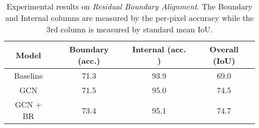 \documentclass[10pt,twocolumn,letterpaper]{article}
\begin{document}
   \begin{table}[h]
   \small
      \begin{center}
         \begin{tabular}{|c|c|c|c|}
            \hline
             Model & Boundary (acc.) & Internal (acc. ) & Overall (IoU) \\
            \hline
            Baseline & 71.3 & 93.9 & 69.0\\
            \hline
            GCN & 71.5 & 95.0 & 74.5\\
            \hline
            GCN + BR & 73.4 & 95.1 & 74.7\\
            \hline
         \end{tabular}
      \end{center}
      \caption{Experimental results on \emph{Residual Boundary Alignment}. The Boundary and Internal columns are measured by the per-pixel accuracy while the 3rd column is measured by standard mean IoU. }
      \label{table:exp-on-bound}
   \end{table}
\end{document}

